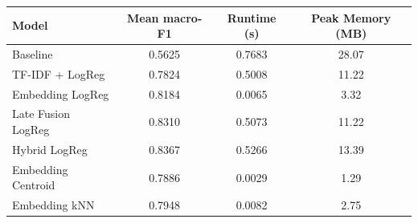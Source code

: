 \begin{tabular}{lccc}
\toprule
Model & Mean macro-F1 & Runtime (s) & Peak Memory (MB) \\
\midrule
Baseline & 0.5625 & 0.7683 & 28.07 \\
TF-IDF + LogReg & 0.7824 & 0.5008 & 11.22 \\
Embedding LogReg & 0.8184 & 0.0065 & 3.32 \\
Late Fusion LogReg & 0.8310 & 0.5073 & 11.22 \\
Hybrid LogReg & 0.8367 & 0.5266 & 13.39 \\
Embedding Centroid & 0.7886 & 0.0029 & 1.29 \\
Embedding kNN & 0.7948 & 0.0082 & 2.75 \\
\bottomrule
\end{tabular}